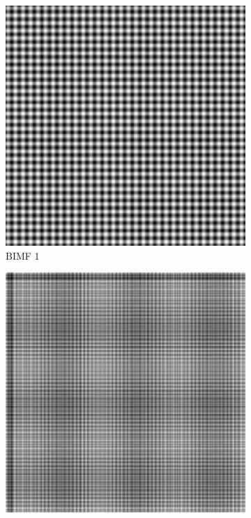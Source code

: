 \begin{figure}
\centering
\begin{subfigure}{.30\textwidth}
  \centering
  \includegraphics[width=.9\linewidth]{img/s_1_1_1}
  \caption{BIMF 1}
\end{subfigure}
\begin{subfigure}{.30\textwidth}
  \centering
  \includegraphics[width=.9\linewidth]{img/s_1_1_2}

\end{subfigure}
\end{figure}
